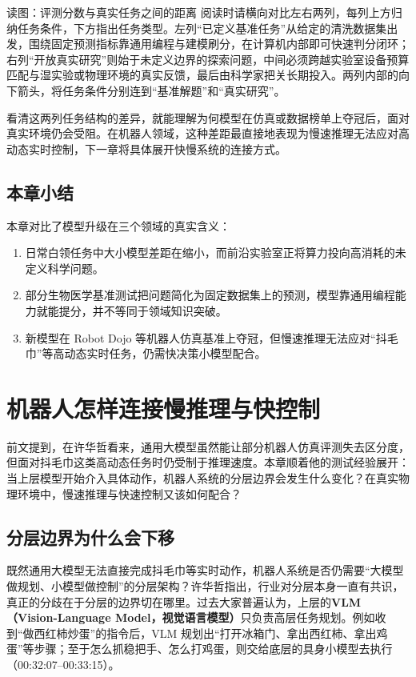\documentclass[UTF8,a4paper,11pt,fontset=fandol]{ctexart}
\begin{document}
\begin{knowledgebox}{读图：评测分数与真实任务之间的距离}
阅读时请横向对比左右两列，每列上方归纳任务条件，下方指出任务类型。左列“已定义基准任务”从给定的清洗数据集出发，围绕固定预测指标靠通用编程与建模刷分，在计算机内部即可快速判分闭环；右列“开放真实研究”则始于未定义边界的探索问题，中间必须跨越实验室设备预算匹配与湿实验或物理环境的真实反馈，最后由科学家把关长期投入。两列内部的向下箭头，将任务条件分别连到“基准解题”和“真实研究”。
\end{knowledgebox}
看清这两列任务结构的差异，就能理解为何模型在仿真或数据榜单上夺冠后，面对真实环境仍会受阻。在机器人领域，这种差距最直接地表现为慢速推理无法应对高动态实时控制，下一章将具体展开快慢系统的连接方式。
\subsection{本章小结}
本章对比了模型升级在三个领域的真实含义：
\begin{enumerate}
\item 日常白领任务中大小模型差距在缩小，而前沿实验室正将算力投向高消耗的未定义科学问题。
\item 部分生物医学基准测试把问题简化为固定数据集上的预测，模型靠通用编程能力就能提分，并不等同于领域知识突破。
\item 新模型在 Robot Dojo 等机器人仿真基准上夺冠，但慢速推理无法应对“抖毛巾”等高动态实时任务，仍需快决策小模型配合。
\end{enumerate}
\section{机器人怎样连接慢推理与快控制}
前文提到，在许华哲看来，通用大模型虽然能让部分机器人仿真评测失去区分度，但面对抖毛巾这类高动态任务时仍受制于推理速度。本章顺着他的测试经验展开：当上层模型开始介入具体动作，机器人系统的分层边界会发生什么变化？在真实物理环境中，慢速推理与快速控制又该如何配合？
\subsection{分层边界为什么会下移}
既然通用大模型无法直接完成抖毛巾等实时动作，机器人系统是否仍需要“大模型做规划、小模型做控制”的分层架构？许华哲指出，行业对分层本身一直有共识，真正的分歧在于分层的边界切在哪里。过去大家普遍认为，上层的\textbf{VLM（Vision-Language Model，视觉语言模型）}只负责高层任务规划。例如收到“做西红柿炒蛋”的指令后，VLM 规划出“打开冰箱门、拿出西红柿、拿出鸡蛋”等步骤；至于怎么抓稳把手、怎么打鸡蛋，则交给底层的具身小模型去执行（00:32:07–00:33:15）。
\end{document}
